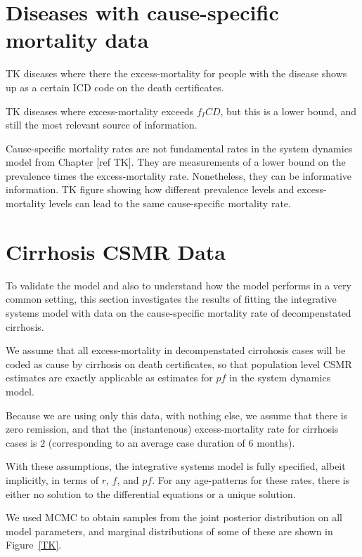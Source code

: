 \section{Diseases with cause-specific mortality data}

TK diseases where there the excess-mortality for people with the
disease shows up as a certain ICD code on the death certificates.

TK diseases where excess-mortality exceeds $f_ICD$, but this is a lower
bound, and still the most relevant source of information.

Cause-specific mortality rates are not fundamental rates in the system
dynamics model from Chapter [ref TK]. They are measurements of a lower
bound on the prevalence times the excess-mortality rate. Nonetheless,
they can be informative information. TK figure showing how different
prevalence levels and excess-mortality levels can lead to the same
cause-specific mortality rate.

\section{Cirrhosis CSMR Data}
To validate the model and also to understand how the model performs in
a very common setting, this section investigates the results of
fitting the integrative systems model with data on the cause-specific
mortality rate of decompenstated cirrhosis.

We assume that all excess-mortality in decompenstated cirrohosis
cases will be coded as cause by cirrhosis on death certificates, so
that population level CSMR estimates are exactly applicable as
estimates for $pf$ in the system dynamics model.

Because we are using only this data, with nothing else, we assume that
there is zero remission, and that the (instantenous) excess-mortality
rate for cirrhosis cases is $2$ (corresponding to an average case
duration of $6$ months).

With these assumptions, the integrative systems model is fully
specified, albeit implicitly, in terms of $r$, $f$, and $pf$.  For any
age-patterns for these rates, there is either no solution to the
differential equations or a unique solution.

We used MCMC to obtain samples from the joint posterior distribution
on all model parameters, and marginal distributions of some of these
are shown in Figure~\ref{TK}.

